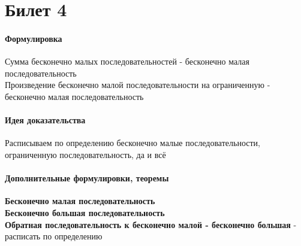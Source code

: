 \documentclass[a4paper,10pt]{article}
\begin{document}
	\section{Билет 4}
	\begin{center} 
		\item \paragraph{Формулировка} 
	\end{center}
	Сумма бесконечно малых последовательностей - бесконечно малая последовательность \\
	Произведение бесконечно малой последовательности на ограниченную - бесконечно малая последовательность \\
	\begin{center} 
		\item \paragraph{Идея доказательства} 
	\end{center}
	Расписываем по определению бесконечно малые последовательности, ограниченную последовательность, да и всё \\
	\begin{center} 
		\item \paragraph{Дополнительные формулировки, теоремы} 
	\end{center}
	\textbf{Бесконечно малая последовательность} \\
	\textbf{Бесконечно большая последовательность} \\
	\textbf{Обратная последовательность к бесконечно малой - бесконечно большая} - расписать по определению
\end{document}
